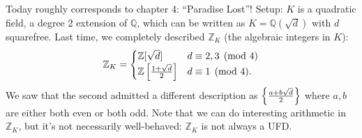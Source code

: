 \begin{remark}

Today roughly corresponds to chapter 4: ``Paradise Lost''! Setup: \(K\)
is a quadratic field, a degree 2 extension of \({\mathbb{Q}}\), which
can be written as \(K = {\mathbb{Q}}(\sqrt{d})\) with \(d\) squarefree.
Last time, we completely described \({\mathbb{Z}}_K\) (the algebraic
integers in \(K\)):
\begin{align*}
{\mathbb{Z}}_K = 
\begin{cases}
{\mathbb{Z}}[ \sqrt{d} ] &  d \equiv 2,3 \pmod 4
\\
{\mathbb{Z}}\left[{1 + \sqrt{d} \over 2}\right] & d \equiv 1 \pmod 4.
\end{cases}
\end{align*}
We saw that the second admitted a different description as
\(\left\{{ {a + b \sqrt{d} \over 2}}\right\}\) where \(a,b\) are either
both even or both odd. Note that we can do interesting arithmetic in
\({\mathbb{Z}}_K\), but it's not necessarily well-behaved:
\({\mathbb{Z}}_K\) is not always a UFD.

\end{remark}


